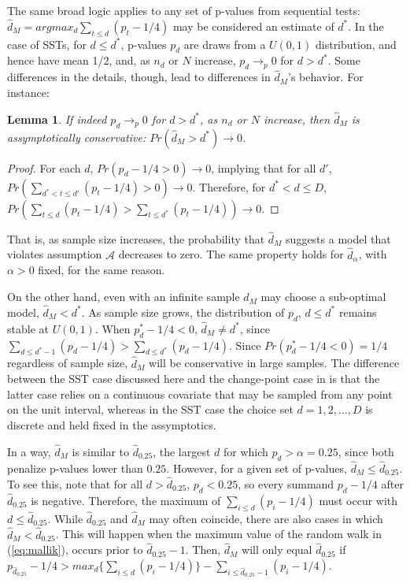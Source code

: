 \documentclass[12pt]{article}\usepackage[]{graphicx}\usepackage[]{color}
\newcommand{\dstar}{d^*}
\newcommand{\dhat}{\hat{d}}
\newcommand{\dhatm}{\hat{d}_M}
\newtheorem{lemma}{Lemma}
\begin{document}
The same broad logic applies to any set of p-values from sequential tests:
$\dhatm=argmax_d \sum_{t\le d} (p_t-1/4)$ may be considered an
estimate of $\dstar$.
In the case of SSTs, for $d\le \dstar$, p-values $p_d$ are draws from
a $U(0,1)$ distribution, and hence have mean 1/2, and, as $n_d$ or $N$
increase, $p_d \rightarrow_p 0$ for $d>\dstar$.
Some differences in the details, though, lead to differences in
$\dhatm$'s behavior.
For instance:
\begin{lemma}
If indeed $p_d\rightarrow_p 0$ for $d>\dstar$, as $n_d$ or $N$
increase, then $\dhatm$ is assymptotically conservative:
$Pr(\dhatm>\dstar)\rightarrow 0$.
\end{lemma}
\begin{proof}
For each $d$, $Pr(p_d -1/4>0)\rightarrow 0$, implying that for all $d'$, $Pr(\sum_{\dstar <t\le d'}
(p_t-1/4)>0)\rightarrow 0$.
Therefore, for $\dstar<d\le D$, $Pr(\sum_{t\le d} (p_t-1/4)> \sum_{t\le
  \dstar} (p_t-1/4))\rightarrow 0$.
\end{proof}
That is, as sample size increases, the probability that $\dhatm$
suggests a model that violates assumption $\mathcal{A}$ decreases to
zero.
The same property holds for $\dhat_\alpha$, with $\alpha>0$ fixed, for
the same reason.

On the other hand, even with an infinite sample $\dhatm$ may choose a
sub-optimal model, $\dhatm<\dstar$.
As sample size grows, the distribution of $p_d$, $d\le \dstar$ remains
stable at $U(0,1)$.
When $p_\dstar-1/4<0$, $\dhatm \neq \dstar$, since $\sum_{d\le
  \dstar-1} (p_d-1/4)>\sum_{d\le \dstar} (p_d-1/4)$.
Since $Pr(p_\dstar-1/4<0)=1/4$ regardless of sample size, $\dhatm$
will be conservative in large samples.
The difference between the SST case discussed here and the
change-point case in \citet{mallik} is that the latter case relies on
a continuous covariate that may be sampled from any point on the unit
interval, whereas in the SST case the choice set $d=1,2,\dots,D$ is
discrete and held fixed in the assymptotics.

In a way, $\dhatm$ is similar to $\dhat_{0.25}$, the largest $d$ for
which $p_d>\alpha=0.25$, since both penalize p-values lower than
$0.25$.
However, for a given set of p-values, $\dhatm \le \dhat_{0.25}$.
To see this, note that for all $d>\dhat_{0.25}$, $p_d<0.25$, so every
summand $p_d-1/4$ after $\dhat_{0.25}$ is negative.
Therefore, the maximum of $\sum_{i\le d} (p_i-1/4)$ must occur with $d
\le \dhat_{0.25}$.
While $\dhat_{0.25}$ and $\dhatm$ may often coincide, there are also
cases in which $\dhatm<\dhat_{0.25}$.
This will happen when the maximum value of the random walk in
(\ref{eq:mallik}), occurs prior to $\dhat_{0.25}-1$.
Then, $\dhatm$ will only equal $\dhat_{0.25}$ if
$p_{\dhat_{0.25}}-1/4>max_d\{ \sum_{i\le d} (p_i-1/4)\}-\sum_{i\le
  \dhat_{0.25}-1} (p_i-1/4)$.
\end{document}
